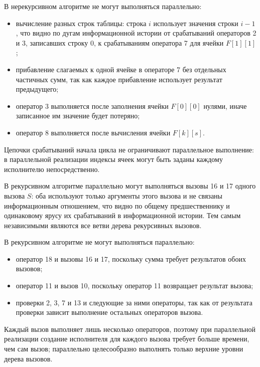 В нерекурсивном алгоритме не могут выполняться параллельно:
\begin{itemize}
    \item вычисление разных строк таблицы: строка $i$ использует значения
    строки $i-1$, что видно по дугам информационной истории от срабатываний
    операторов 2 и 3, записавших строку 0, к срабатываниям оператора 7
    для ячейки $F[1][1]$;
    \item прибавление слагаемых к одной ячейке в операторе 7 без отдельных
    частичных сумм, так как каждое прибавление использует результат
    предыдущего;
    \item оператор 3 выполняется после заполнения ячейки $F[0][0]$ нулями,
    иначе записанное им значение будет потеряно;
    \item оператор 8 выполняется после вычисления ячейки $F[k][s]$.
\end{itemize}

Цепочки срабатываний начала цикла не ограничивают параллельное
выполнение: в параллельной реализации индексы ячеек могут быть заданы
каждому исполнителю непосредственно.

В рекурсивном алгоритме параллельно могут выполняться вызовы 16
и 17 одного вызова $S$: оба используют только аргументы этого вызова
и не связаны информационным отношением, что видно по общему предшественнику
и одинаковому ярусу их срабатываний в информационной истории. Тем самым
независимыми являются все ветви дерева рекурсивных вызовов.

В рекурсивном алгоритме не могут выполняться параллельно:
\begin{itemize}
    \item оператор 18 и вызовы 16 и 17, поскольку сумма требует
    результатов обоих вызовов;
    \item оператор 11 и вызов 10, поскольку оператор 11 возвращает результат вызова;
    \item проверки 2, 3, 7 и 13 и следующие за ними операторы, так как
    от результата проверки зависит выполнение остальных операторов вызова.
\end{itemize}

Каждый вызов выполняет лишь несколько операторов, поэтому при параллельной
реализации создание исполнителя для каждого вызова требует больше времени,
чем сам вызов; параллельно целесообразно выполнять только верхние уровни
дерева вызовов.

